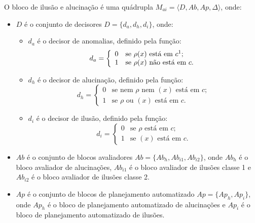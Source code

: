 \begin{definition}
\label{def:illuHallu}
    O bloco de ilusão e alucinação é uma quádrupla $M_{ai} = \langle D, Ab, Ap, \Delta \rangle$, onde:
    
    \begin{itemize}
        \item $D$ é o conjunto de decisores $D = \{d_{a}, d_{h}, d_{i}\}$, onde:
             \begin{itemize}
                \item $d_{a}$ é o decisor de anomalias, definido pela função:
                \[ d_{a} = \left\{ \begin{array}{ll}
                0 & \mbox{se $\rho(x)$ está em $c$\footnotemark};\\
                1 & \mbox{se $\rho(x)$ não está em $c$}.\end{array} \right. \]
             
                \item $d_{h}$ é o decisor de alucinação, definido pela função:
                \[ d_{h} = \left\{ \begin{array}{ll}
                0 & \mbox{se nem $\rho$ nem $(x)$ está em $c$};\\
                1 & \mbox{se $\rho$ ou $(x)$ está em $c$}.\end{array} \right. \]
                
                \item $d_{i}$ é o decisor de ilusão, definido pela função:
                \[ d_{i} = \left\{ \begin{array}{ll}
                0 & \mbox{se $\rho$ está em $c$};\\
                1 & \mbox{se $(x)$ está em $c$}.\end{array} \right. \]
            \end{itemize}
        
        
        \item $Ab$ é o conjunto de blocos avaliadores $Ab = \{Ab_{h}, Ab_{i1}, Ab_{i2}\}$, onde $Ab_{h}$ é o bloco avaliador de alucinações, $Ab_{i1}$ é o bloco avaliador de ilusões classe 1 e $Ab_{i2}$ é o bloco avaliador de ilusões classe 2.
        
        \item $Ap$ é o conjunto de blocos de planejamento automatizado $Ap = \{Ap_{h}, Ap_{i}\}$, onde $Ap_{h}$ é o bloco de planejamento automatizado de alucinações e $Ap_{i}$ é o bloco de planejamento automatizado de ilusões.
        

\end{itemize}
\end{definition}
